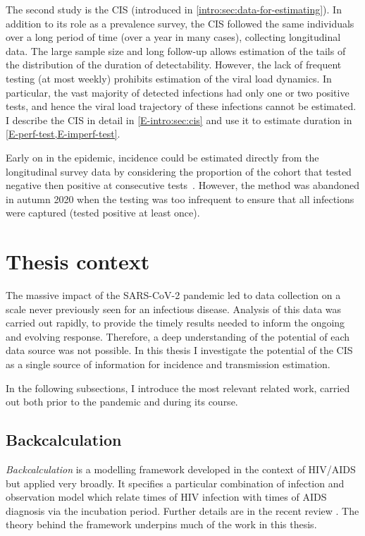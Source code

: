 \documentclass[thesis.tex]{subfiles}
\begin{document}
The second study is the CIS (introduced in \cref{intro:sec:data-for-estimating}).
In addition to its role as a prevalence survey, the CIS followed the same individuals over a long period of time (over a year in many cases), collecting longitudinal data.
The large sample size and long follow-up allows estimation of the tails of the distribution of the duration of detectability.
However, the lack of frequent testing (at most weekly) prohibits estimation of the viral load dynamics.
In particular, the vast majority of detected infections had only one or two positive tests, and hence the viral load trajectory of these infections cannot be estimated.
I describe the CIS in detail in \cref{E-intro:sec:cis} and use it to estimate duration in \cref{E-perf-test,E-imperf-test}.

Early on in the epidemic, incidence could be estimated directly from the longitudinal survey data by considering the proportion of the cohort that tested negative then positive at consecutive tests~\autocite{onsIncidenceOld}.
However, the method was abandoned in autumn 2020 when the testing was too infrequent to ensure that all infections were captured (\ie tested positive at least once).


\section{Thesis context}

The massive impact of the SARS-CoV-2 pandemic led to data collection on a scale never previously seen for an infectious disease.
Analysis of this data was carried out rapidly, to provide the timely results needed to inform the ongoing and evolving response.
Therefore, a deep understanding of the potential of each data source was not possible.
In this thesis I investigate the potential of the CIS as a single source of information for incidence and transmission estimation.

In the following subsections, I introduce the most relevant related work, carried out both prior to the pandemic and during its course.

\subsection{Backcalculation}

\emph{Backcalculation} is a modelling framework developed in the context of HIV/AIDS~\autocite{brookmeyerMethod} but applied very broadly.
It specifies a particular combination of infection and observation model which relate times of HIV infection with times of AIDS diagnosis via the incubation period.
Further details are in the recent review \textcite{sunModeling}.
The theory behind the framework underpins much of the work in this thesis.
\end{document}
